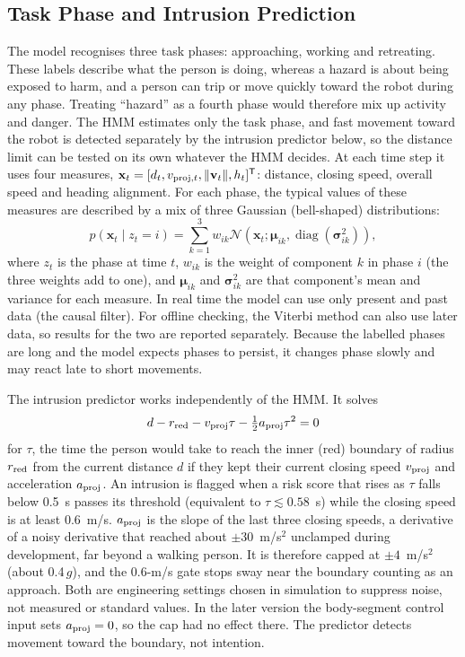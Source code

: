 \documentclass{IEEEtran}
\begin{document}
\subsection{Task Phase and Intrusion Prediction}
\label{sec:context}
The model recognises three task phases: approaching, working and retreating.
These labels describe what the person is doing, whereas a hazard is about being
exposed to harm, and a person can trip or move quickly toward the robot during
any phase. Treating ``hazard'' as a fourth phase would therefore mix up activity
and danger. The HMM estimates only the task phase, and fast movement toward the
robot is detected separately by the intrusion predictor below, so the distance
limit can be tested on its own whatever the HMM decides. At
each time step it uses four measures,
$\mathbf x_t=[d_t,v_{{\rm proj},t},\|\mathbf v_t\|,h_t]^{\mathsf T}$: distance,
closing speed, overall speed and heading alignment. For each phase, the
typical values of these measures are described by a mix of three Gaussian
(bell-shaped) distributions:
\begin{equation}
p(\mathbf x_t\mid z_t=i)=\sum_{k=1}^{3}w_{ik}
\mathcal N(\mathbf x_t;\boldsymbol\mu_{ik},\operatorname{diag}
(\boldsymbol\sigma^2_{ik})),
\end{equation}
where $z_t$ is the phase at time $t$, $w_{ik}$ is the weight of component $k$
in phase $i$ (the three weights add to one), and $\boldsymbol\mu_{ik}$ and
$\boldsymbol\sigma^2_{ik}$ are that component's mean and variance for each
measure. In real time the model can use only present and past data (the
causal filter). For offline checking, the Viterbi method can also use later
data, so results for the two are reported separately. Because the labelled
phases are long and the model expects phases to persist, it changes phase
slowly and may react late to short movements.

The intrusion predictor works independently of the HMM. It solves
\begin{equation}
d-r_{\rm red}-v_{\rm proj}\tau-\tfrac12 a_{\rm proj}\tau^2=0
\end{equation}
for $\tau$, the time the person would take to reach the inner (red) boundary of
radius $r_{\rm red}$ from the current distance $d$ if they kept their current
closing speed $v_{\rm proj}$ and acceleration $a_{\rm proj}$. An intrusion is
flagged when a risk score that rises as $\tau$ falls below 0.5~s passes its
threshold (equivalent to $\tau\lesssim0.58$~s) while the closing speed is at
least 0.6~m/s. $a_{\rm proj}$ is the slope of the last three closing speeds, a
derivative of a noisy derivative that reached about $\pm30$~m/s$^2$ unclamped
during development, far beyond a walking person. It is therefore capped at
$\pm4$~m/s$^2$ (about 0.4\,$g$), and the 0.6-m/s gate stops sway near the
boundary counting as an approach. Both are engineering settings chosen in
simulation to suppress noise, not measured or standard values. In the later
version the body-segment control input sets $a_{\rm proj}=0$, so the cap had
no effect there. The predictor detects movement toward the boundary, not
intention.
\end{document}
